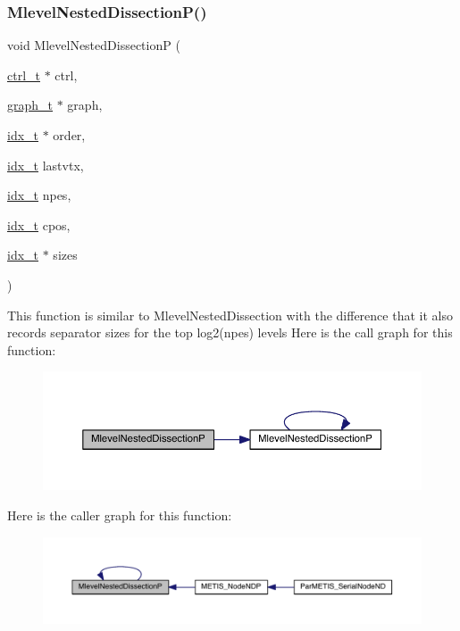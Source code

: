\subsubsection{\texorpdfstring{Mlevel\+Nested\+Dissection\+P()}{MlevelNestedDissectionP()}}
{\footnotesize\ttfamily void Mlevel\+Nested\+DissectionP (\begin{DoxyParamCaption}\item[{\hyperlink{a00742}{ctrl\+\_\+t} $\ast$}]{ctrl,  }\item[{\hyperlink{a00734}{graph\+\_\+t} $\ast$}]{graph,  }\item[{\hyperlink{a00876_aaa5262be3e700770163401acb0150f52}{idx\+\_\+t} $\ast$}]{order,  }\item[{\hyperlink{a00876_aaa5262be3e700770163401acb0150f52}{idx\+\_\+t}}]{lastvtx,  }\item[{\hyperlink{a00876_aaa5262be3e700770163401acb0150f52}{idx\+\_\+t}}]{npes,  }\item[{\hyperlink{a00876_aaa5262be3e700770163401acb0150f52}{idx\+\_\+t}}]{cpos,  }\item[{\hyperlink{a00876_aaa5262be3e700770163401acb0150f52}{idx\+\_\+t} $\ast$}]{sizes }\end{DoxyParamCaption})}

This function is similar to Mlevel\+Nested\+Dissection with the difference that it also records separator sizes for the top log2(npes) levels Here is the call graph for this function\+:\nopagebreak
\begin{figure}[H]
\begin{center}
\leavevmode
\includegraphics[width=350pt]{a00945_a55cff7f4deda5d27c8736089a878964c_cgraph}
\end{center}
\end{figure}
Here is the caller graph for this function\+:\nopagebreak
\begin{figure}[H]
\begin{center}
\leavevmode
\includegraphics[width=350pt]{a00945_a55cff7f4deda5d27c8736089a878964c_icgraph}
\end{center}
\end{figure}
\mbox{\label{a00945_aeeaa7f4ed9878ae2f7faff0e2402fd87}} 
